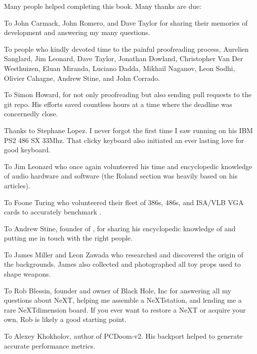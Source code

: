 Many people helped completing this book. Many thanks are due:\\
\par
To John Carmack, John Romero, and Dave Taylor for sharing their memories of \doom{} development and answering my many questions.\\
\par
To people who kindly devoted time to the painful proofreading process, Aurelien Sanglard, Jim Leonard, Dave Taylor, Jonathan Dowland, Christopher Van Der Westhuizen, Eluan Miranda, Luciano Dadda, Mikhail Naganov, Leon Sodhi, Olivier Cahagne, Andrew Stine, and John Corrado.\\
\par
To Simon Howard, for not only proofreading but also sending pull requests to the git repo. His efforts saved countless hours at a time where the deadline was
concernedly close.\\
\par
Thanks to Stephane Lopez. I never forgot the first time I saw \doom{} running on his IBM PS2 486 SX 33Mhz. That clicky keyboard also initiated an ever lasting love for good keyboard.\\
\par
To Jim Leonard who once again volunteered his time and encyclopedic knowledge of audio hardware and software (the Roland section was heavily based on his articles).\\
\par
To Foone Turing who volunteered their fleet of 386s, 486s, and ISA/VLB VGA cards to accurately benchmark \doom{}.\\
\par
To Andrew Stine, founder of , for sharing his encyclopedic knowledge of \doom{} and putting me in touch with the right people.\\
\par
To James Miller and Leon Zawada who researched and discovered the origin of the backgrounds. James also collected and photographed all toy props used to shape \doom{} weapons.\\
\par
To Rob Blessin, founder and owner of Black Hole, Inc for answering all my questions about NeXT, helping me assemble a NeXTstation, and lending me a rare NeXTdimension board. If you ever want to restore a NeXT or acquire your own, Rob is likely a good starting point.\\
\par
To Alexey Khokholov, author of PCDoom-v2. His backport helped to generate accurate performance metrics.\\
